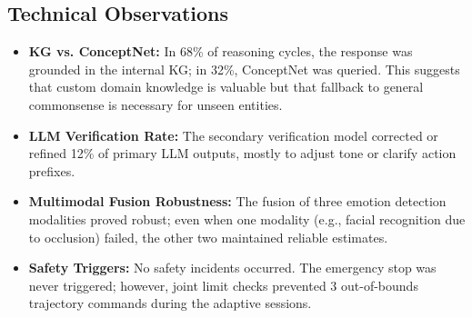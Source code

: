 \subsection{Technical Observations}

\begin{itemize}
\item \textbf{KG vs. ConceptNet:} In 68\% of reasoning cycles, the response was grounded in the internal KG; in 32\%, ConceptNet was queried. This suggests that custom domain knowledge is valuable but that fallback to general commonsense is necessary for unseen entities.

\item \textbf{LLM Verification Rate:} The secondary verification model corrected or refined 12\% of primary LLM outputs, mostly to adjust tone or clarify action prefixes.

\item \textbf{Multimodal Fusion Robustness:} The fusion of three emotion detection modalities proved robust; even when one modality (e.g., facial recognition due to occlusion) failed, the other two maintained reliable estimates.

\item \textbf{Safety Triggers:} No safety incidents occurred. The emergency stop was never triggered; however, joint limit checks prevented 3 out-of-bounds trajectory commands during the adaptive sessions.
\end{itemize}
